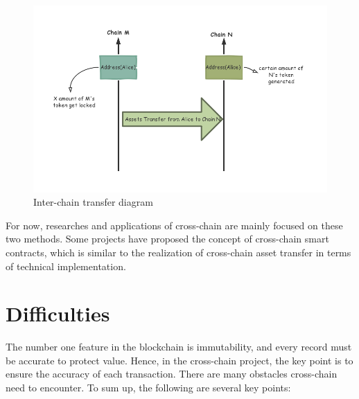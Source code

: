 \begin{enumerate}
    
    \begin{figure}[H]
    \includegraphics[width=1\textwidth]{./figures/transfer.png}
    \centering
    \caption{Inter-chain transfer diagram}%
    \centering
    \label{fig:transfer}
    \end{figure}
\end{enumerate}


\noindent For now, researches and applications of cross-chain are mainly focused on these two methods. Some projects have proposed the concept of cross-chain smart contracts, which is similar to the realization of cross-chain asset transfer in terms of technical implementation.

\section{Difficulties}
\noindent The number one feature in the blockchain is immutability, and every record must be accurate to protect value. Hence, in the cross-chain project, the key point is to ensure the accuracy of each transaction. There are many obstacles cross-chain need to encounter. To sum up, the following are several key points:

